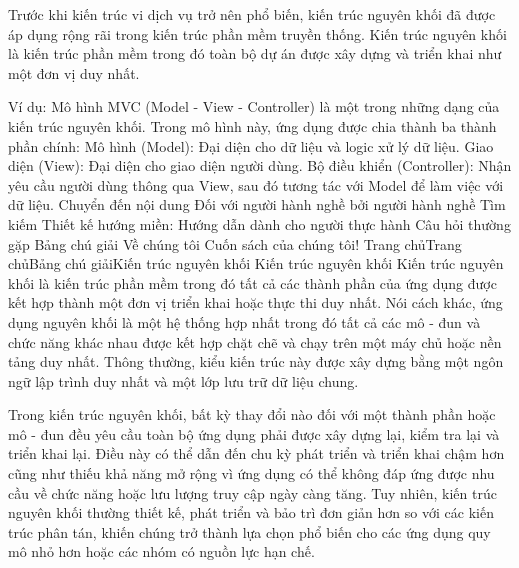 Trước khi kiến trúc vi dịch vụ trở nên phổ biến, kiến trúc nguyên khối đã được áp dụng rộng rãi trong kiến trúc phần mềm truyền thống. Kiến trúc nguyên khối là kiến trúc phần mềm trong đó toàn bộ dự án được xây dựng và triển khai như một đơn vị duy nhất.

Ví dụ: Mô hình MVC (Model - View - Controller) là một trong những dạng của kiến trúc nguyên khối.
Trong mô hình này, ứng dụng được chia thành ba thành phần chính:
Mô hình (Model): Đại diện cho dữ liệu và logic xử lý dữ liệu.
Giao diện (View): Đại diện cho giao diện người dùng.
Bộ điều khiển (Controller): Nhận yêu cầu người dùng thông qua View, sau đó tương tác với Model để làm việc với dữ liệu.
Chuyển đến nội dung
Đối với người hành nghề bởi người hành nghề
Tìm kiếm
Thiết kế hướng miền: Hướng dẫn dành cho người thực hành
Câu hỏi thường gặp
Bảng chú giải
Về chúng tôi
Cuốn sách của chúng tôi!
Trang chủTrang chủBảng chú giảiKiến trúc nguyên khối
Kiến trúc nguyên khối
Kiến trúc nguyên khối là kiến trúc phần mềm trong đó tất cả các thành phần của ứng dụng được kết hợp thành một đơn vị triển khai hoặc thực thi duy nhất. Nói cách khác, ứng dụng nguyên khối là một hệ thống hợp nhất trong đó tất cả các mô - đun và chức năng khác nhau được kết hợp chặt chẽ và chạy trên một máy chủ hoặc nền tảng duy nhất. Thông thường, kiểu kiến trúc này được xây dựng bằng một ngôn ngữ lập trình duy nhất và một lớp lưu trữ dữ liệu chung.

Trong kiến trúc nguyên khối, bất kỳ thay đổi nào đối với một thành phần hoặc mô - đun đều yêu cầu toàn bộ ứng dụng phải được xây dựng lại, kiểm tra lại và triển khai lại. Điều này có thể dẫn đến chu kỳ phát triển và triển khai chậm hơn cũng như thiếu khả năng mở rộng vì ứng dụng có thể không đáp ứng được nhu cầu về chức năng hoặc lưu lượng truy cập ngày càng tăng. Tuy nhiên, kiến trúc nguyên khối thường thiết kế, phát triển và bảo trì đơn giản hơn so với các kiến trúc phân tán, khiến chúng trở thành lựa chọn phổ biến cho các ứng dụng quy mô nhỏ hơn hoặc các nhóm có nguồn lực hạn chế.

